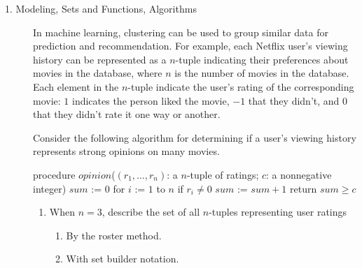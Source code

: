 \begin{description}

\item[1. Modeling, Sets and Functions, Algorithms] 
In machine learning, clustering can be used to group similar data for prediction and recommendation.  For example,
each Netflix user's viewing history can be represented as a $n$-tuple indicating their preferences about
movies in the database, where $n$ is the number of movies in the database.  Each element in the $n$-tuple indicate
the user's rating of the corresponding movie: 
$1$ indicates the person liked the movie, $-1$
that they didn't, and $0$ that they didn't rate it one way or another.

Consider the following algorithm for determining if a user's viewing history represents
strong opinions on many movies.
\begin{algorithm}[caption={Determine if user's ratings tuple encode strong opinions}]
procedure $\textit{opinion}$($(r_1, \ldots, r_n)$: a $n$-tuple of ratings; $c$: a nonnegative integer)
$sum$ := $0$
for $i$ := $1$ to $n$
  if $r_i \neq 0$
    $sum$ := $sum + 1$
return $sum \geq c$
\end{algorithm}

  \begin{enumerate}%
  \item When $n = 3$, describe the set of all $n$-tuples representing user ratings
  \begin{enumerate}%
  \item By the roster method.
  
  \fi
  
  \item With set builder notation.
  
  \fi
  

\end{enumerate}
\end{enumerate}
\end{description}
